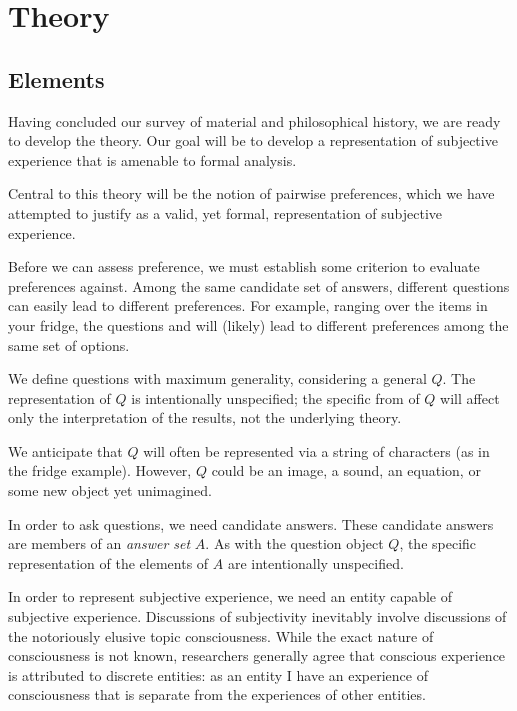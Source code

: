 \documentclass[12pt]{book}
\begin{document}
\section{Theory}

\subsection{Elements}

Having concluded our survey of material and philosophical history, we are ready to develop the theory.
Our goal will be to develop a representation of subjective experience that is amenable to formal analysis.

Central to this theory will be the notion of pairwise preferences, which we have attempted to justify as a valid, yet formal, representation of subjective experience.

Before we can assess preference, we must establish some criterion to evaluate preferences against.
Among the same candidate set of answers, different questions can easily lead to different preferences.
For example, ranging over the items in your fridge, the questions  and  will (likely) lead to different preferences among the same set of options.

\bigskip

We define questions with maximum generality, considering a general  $Q$.
The representation of $Q$ is intentionally unspecified; the specific from of $Q$ will affect only the interpretation of the results, not the underlying theory.

We anticipate that $Q$ will often be represented via a string of characters (as in the fridge example).
However, $Q$ could be an image, a sound, an equation, or some new object yet unimagined.

\bigskip

In order to ask questions, we need candidate answers.
These candidate answers are members of an \textit{answer set} $A$.
As with the question object $Q$, the specific representation of the elements of $A$ are intentionally unspecified.

\bigskip

In order to represent subjective experience, we need an entity capable of subjective experience.
Discussions of subjectivity inevitably involve discussions of the notoriously elusive topic consciousness.
While the exact nature of consciousness is not known, researchers generally agree that conscious experience is attributed to discrete entities: as an entity I have an experience of consciousness that is separate from the experiences of other entities.
 
\end{document}
